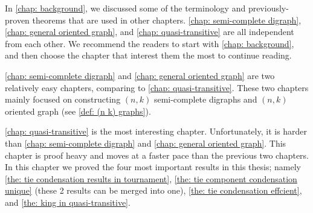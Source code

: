 In \cref{chap: background}, we discussed some of the terminology
and previously-proven theorems that are used in other chapters.
\cref{chap: semi-complete digraph}, \cref{chap: general oriented graph},
and \cref{chap: quasi-transitive} are all independent from each other.
We recommend the readers to start with \cref{chap: background},
and then choose the chapter that interest them
the most to continue reading.

\cref{chap: semi-complete digraph} and \cref{chap: general oriented graph}
are two relatively easy chapters, comparing to \cref{chap: quasi-transitive}.
These two chapters mainly focused on constructing
\((n, k)\) semi-complete digraphs and
\((n, k)\) oriented graph (see \cref{def: (n k) graphs}).

\cref{chap: quasi-transitive} is the most interesting chapter.
Unfortunately, it is harder than
\cref{chap: semi-complete digraph} and \cref{chap: general oriented graph}.
This chapter is proof heavy and
moves at a faster pace than the previous two chapters.
In this chapter we proved the four most important results
in this thesis; namely
\cref{the: tie condensation results in tournament},
\cref{the: tie component condensation unique}
(these 2 results can be merged into one),
\cref{the: tie condensation effcient},
and \cref{the: king in quasi-transitive}.
